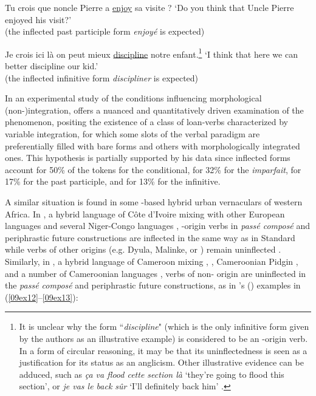 \documentclass[output=paper,colorlinks,citecolor=brown]{langscibook}
\begin{document}
\begin{exe}
	\ex \label{09ex10} Tu crois que noncle Pierre a \ul{enjoy} sa visite ?
	\trans ‘Do you think that Uncle Pierre enjoyed his visit?’ \\
	(the inflected past participle form \emph{enjoyé} is expected)
	
	\ex \label{09ex11} Je crois ici là on peut mieux \ul{discipline} notre enfant.\footnote{It is unclear why the form ``\emph{discipline}" (which is the only infinitive form given by the authors as an illustrative example) is considered to be an -origin verb. In a form of circular reasoning, it may be that its uninflectedness is seen as a justification for its status as an anglicism. Other illustrative evidence can be adduced, such as \emph{ça va flood cette section là} `they're going to flood this section', or \emph{je vas le back sûr} `I'll definitely back him' \citep[19, 26]{root2018}.}
	\trans ‘I think that here we can better discipline our kid.’ \\
	(the inflected infinitive form \emph{discipliner} is expected)
\end{exe}

In an experimental study of the conditions influencing morphological (non\mbox{-})in\-tegration, \citet{root2018} offers a nuanced and quantitatively driven examination of the phenomenon, positing the existence of a class of loan-verbs characterized by variable integration, for which some slots of the verbal paradigm are preferentially filled with bare forms and others with morphologically integrated ones. This hypothesis is partially supported by his data since inflected forms account for 50\% of the tokens for the conditional, for 32\% for the \emph{imparfait}, for 17\% for the past participle, and for 13\% for the infinitive.

A similar situation is found in some -based hybrid urban vernaculars of western Africa. In , a hybrid language of Côte d'Ivoire mixing  with other European languages and several Niger-Congo languages \citep{sande2015, boutin2021}, -origin verbs in \emph{passé composé} and periphrastic future constructions are inflected in the same way as in Standard  while verbs of other origins (e.g. Dyula, Malinke, or ) remain uninflected \citep{ahua2008, atsencho2014}. Similarly, in , a hybrid language of Cameroon mixing , , Cameroonian Pidgin , and a number of Cameroonian languages \citep{kiesling2022}, verbs of non- origin are uninflected in the \emph{passé composé} and periphrastic future constructions, as in \citeauthor{bogni2018}'s (\citeyear[185]{bogni2018}) examples in (\ref{09ex12}--\ref{09ex13}):
\end{document}
